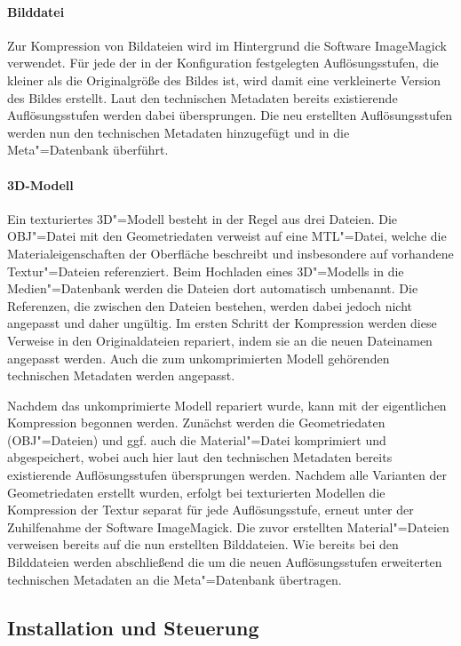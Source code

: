 \paragraph{Bilddatei}

Zur Kompression von Bildateien wird im Hintergrund die Software ImageMagick verwendet. Für jede der in der Konfiguration festgelegten Auflösungsstufen, die kleiner als die Originalgröße des Bildes ist, wird damit eine verkleinerte Version des Bildes erstellt. Laut den technischen Metadaten bereits existierende Auflösungsstufen werden dabei übersprungen. Die neu erstellten Auflösungsstufen werden nun den technischen Metadaten hinzugefügt und in die Meta"=Datenbank überführt.

\paragraph{3D-Modell}

Ein texturiertes 3D"=Modell besteht in der Regel aus drei Dateien. Die OBJ"=Datei mit den Geometriedaten verweist auf eine MTL"=Datei, welche die Materialeigenschaften der Oberfläche beschreibt und insbesondere auf vorhandene Textur"=Dateien referenziert. Beim Hochladen eines 3D"=Modells in die Medien"=Datenbank werden die Dateien dort automatisch umbenannt. Die Referenzen, die zwischen den Dateien bestehen, werden dabei jedoch nicht angepasst und daher ungültig. Im ersten Schritt der Kompression werden diese Verweise in den Originaldateien repariert, indem sie an die neuen Dateinamen angepasst werden. Auch die zum unkomprimierten Modell gehörenden technischen Metadaten werden angepasst.

Nachdem das unkomprimierte Modell repariert wurde, kann mit der eigentlichen Kompression begonnen werden. Zunächst werden die Geometriedaten (OBJ"=Dateien) und ggf. auch die Material"=Datei komprimiert und abgespeichert, wobei auch hier laut den technischen Metadaten bereits existierende Auflösungsstufen übersprungen werden. Nachdem alle Varianten der Geometriedaten erstellt wurden, erfolgt bei texturierten Modellen die Kompression der Textur separat für jede Auflösungsstufe, erneut unter der Zuhilfenahme der Software ImageMagick. Die zuvor erstellten Material"=Dateien verweisen bereits auf die nun erstellten Bilddateien. Wie bereits bei den Bilddateien werden abschließend die um die neuen Auflösungsstufen erweiterten technischen Metadaten an die Meta"=Datenbank übertragen.

\subsection{Installation und Steuerung}

